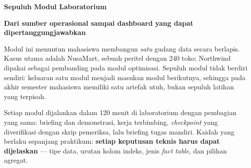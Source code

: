 \thispagestyle{empty}
\noindent
{}\hspace{.5cm}%
\hfill
\begin{minipage}[b]{6.6cm}
  \raggedleft\footnotesize
  {\coursecode\enspace\bfseries\coursename}\par\vspace{.25em}
  {\color{DWSage!80!DWInk}\large\bfseries\programname}\par
  {\facultyname}\par{\universityname}
\end{minipage}

\vspace{1.0cm}
\noindent\brandrule

\vspace{1.8cm}
\noindent
{\color{Slate}\large\sampulspasi{\jenisdokumen}}\par
\vspace{.45cm}
{\fontsize{30}{36}\selectfont\bfseries\color{Ink}\coursename}\par
\vspace{.5cm}
{\Large\color{DWOrange}\bfseries Sepuluh Modul Laboratorium\par
 \normalsize\color{Slate}\docsemester}\par

\vspace{1.1cm}
\noindent\colorbox{DWOrange}{%
  \parbox{\dimexpr\linewidth-2\fboxsep}{%
    \color{white}\vspace{.35em}
    \hspace{.2em}\large\bfseries Dari sumber operasional sampai dashboard yang
    dapat dipertanggungjawabkan\par\vspace{.45em}}}

\vspace{1.0cm}
\noindent
\begin{minipage}{\linewidth}
  \small
  Modul ini menuntun mahasiswa membangun \emph{satu} gudang data secara
  berlapis. Kasus utama adalah NusaMart, sebuah peritel dengan 240 toko;
  Northwind dipakai sebagai pembanding pada modul optimisasi. Sepuluh modul
  tidak berdiri sendiri: keluaran satu modul menjadi masukan modul berikutnya,
  sehingga pada akhir semester mahasiswa memiliki satu artefak utuh, bukan
  sepuluh latihan yang terpisah.

  \vspace{.6em}
  Setiap modul dijalankan dalam 120 menit di laboratorium dengan pembagian yang
  sama: briefing dan demonstrasi, kerja terbimbing, \emph{checkpoint} yang
  diverifikasi dengan skrip pemeriksa, lalu briefing tugas mandiri. Kaidah yang
  berlaku sepanjang praktikum: \textbf{setiap keputusan teknis harus dapat
  dijelaskan} --- tipe data, urutan kolom indeks, jenis \emph{fact table}, dan
  pilihan agregat.
\end{minipage}

